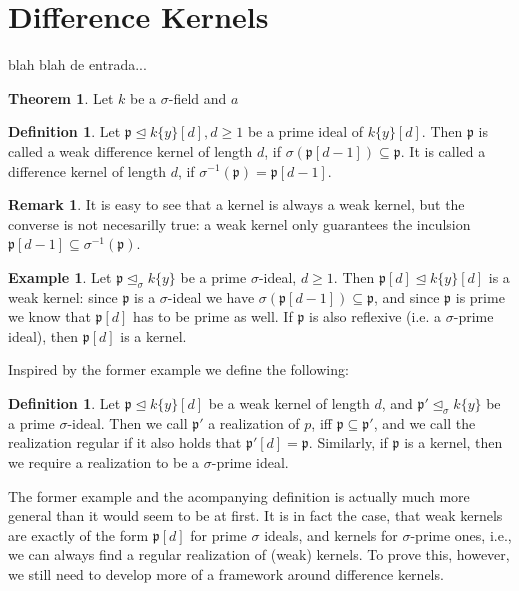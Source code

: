 \documentclass{article}
\def\p{\mathfrak{p}}
\def\s{\sigma}
\def\si{\unlhd_{\sigma}}
\theoremstyle{definition}
\newtheorem{theorem}[Satz]{Theorem}
\newtheorem{ex}[Satz]{Example}
\newtheorem{rem}[Satz]{Remark}
\newtheorem{defn}[Satz]{Definition}
\begin{document}
\section{Difference Kernels}

blah blah de entrada...
\begin{theorem}

Let $k$ be a $\s$-field and $a$ 
\end{theorem}

\begin{defn}
Let $\p \unlhd k\{y\}[d], d \geq 1$ be a prime ideal of $k\{y\}[d]$. Then $\p$ is called a weak difference kernel of length $d$, if $\s(\p[d-1]) \subseteq \p$. It is called a difference kernel of length $d$, if $\s^{-1}(\p) = \p[d-1]$.
\end{defn}

\begin{rem}
It is easy to see that a kernel is always a weak kernel, but the converse is not necesarilly true: a weak kernel only guarantees the inculsion $\p[d-1] \subseteq \s^{-1}(\p)$.
\end{rem}

\begin{ex}
Let $\p \si k\{y\}$ be a prime $\s$-ideal, $d \geq 1$. Then $\p[d] \unlhd k\{y\}[d]$ is a weak kernel: since $\p$ is a $\s$-ideal we have $\s(\p[d-1]) \subseteq \p$, 
and since $\p$ is prime we know that $\p[d]$ has to be prime as well. If $\p$ is also reflexive (i.e. a $\s$-prime ideal), then $\p[d]$ is a kernel. 
\end{ex}

Inspired by the former example we define the following:
\begin{defn}
Let $\p \unlhd k\{y\}[d]$ be a weak kernel of length $d$, and $\p' \si k\{y\}$ be a prime $\s$-ideal. Then we call $\p'$ a realization of $p$, iff $\p \subseteq \p'$, 
and we call the realization regular if it also holds that $\p'[d] = \p$. Similarly, if $\p$ is a kernel, then we require a realization to be a $\s$-prime ideal.
\end{defn}

The former example and the acompanying definition is actually much more general than it would seem to be at first. 
It is in fact the case, that weak kernels are exactly of the form $\p[d]$ for prime $\s$ ideals,
and kernels for $\s$-prime ones, i.e., we can always find a regular realization of (weak) kernels. 
To prove this, however, we still need to develop more of a framework around difference kernels.
\end{document}
